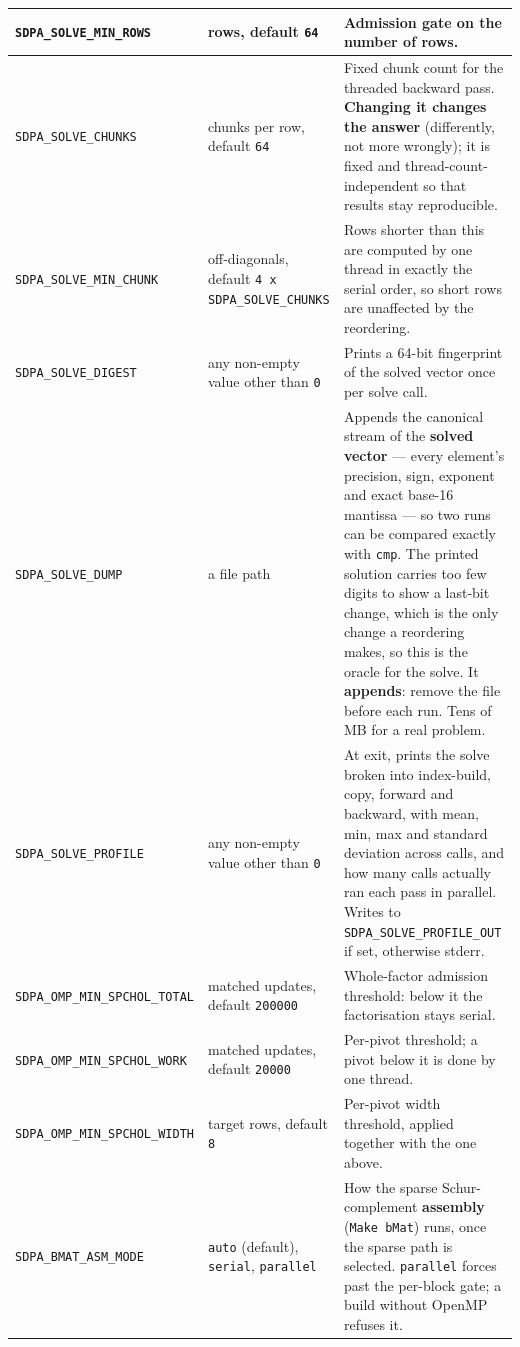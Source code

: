 \documentclass[11pt]{article}
\newcommand{\code}[1]{\texttt{#1}}
\begin{document}
\begin{longtable}{@{}p{}p{}p{}@{}}
\midrule
\code{SDPA\_SOLVE\_MIN\_ROWS} & rows, default \code{64} & Admission gate on the number of rows. \\
\midrule
\code{SDPA\_SOLVE\_CHUNKS} & chunks per row, default \code{64} & Fixed chunk count for the threaded backward pass. \textbf{Changing it changes the answer} (differently, not more wrongly); it is fixed and thread-count-independent so that results stay reproducible. \\
\midrule
\code{SDPA\_SOLVE\_MIN\_CHUNK} & off-diagonals, default \code{4 x SDPA\_SOLVE\_CHUNKS} & Rows shorter than this are computed by one thread in exactly the serial order, so short rows are unaffected by the reordering. \\
\midrule
\code{SDPA\_SOLVE\_DIGEST} & any non-empty value other than \code{0} & Prints a 64-bit fingerprint of the solved vector once per solve call. \\
\midrule
\code{SDPA\_SOLVE\_DUMP} & a file path & Appends the canonical stream of the \textbf{solved vector} --- every element's precision, sign, exponent and exact base-16 mantissa --- so two runs can be compared exactly with \code{cmp}. The printed solution carries too few digits to show a last-bit change, which is the only change a reordering makes, so this is the oracle for the solve. It \textbf{appends}: remove the file before each run. Tens of MB for a real problem. \\
\midrule
\code{SDPA\_SOLVE\_PROFILE} & any non-empty value other than \code{0} & At exit, prints the solve broken into index-build, copy, forward and backward, with mean, min, max and standard deviation across calls, and how many calls actually ran each pass in parallel. Writes to \code{SDPA\_SOLVE\_PROFILE\_OUT} if set, otherwise stderr. \\
\midrule
\code{SDPA\_OMP\_MIN\_SPCHOL\_TOTAL} & matched updates, default \code{200000} & Whole-factor admission threshold: below it the factorisation stays serial. \\
\midrule
\code{SDPA\_OMP\_MIN\_SPCHOL\_WORK} & matched updates, default \code{20000} & Per-pivot threshold; a pivot below it is done by one thread. \\
\midrule
\code{SDPA\_OMP\_MIN\_SPCHOL\_WIDTH} & target rows, default \code{8} & Per-pivot width threshold, applied together with the one above. \\
\midrule
\code{SDPA\_BMAT\_ASM\_MODE} & \code{auto} (default), \code{serial}, \code{parallel} & How the sparse Schur-complement \textbf{assembly} (\code{Make bMat}) runs, once the sparse path is selected. \code{parallel} forces past the per-block gate; a build without OpenMP refuses it. \\

\end{longtable}
\end{document}
